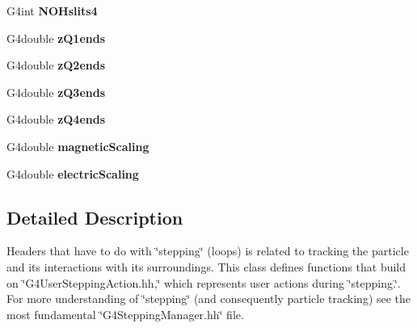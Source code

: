 \begin{DoxyCompactItemize}
\item 
\hypertarget{EMMASteppingAction_8hh_a2999d2feb52b63936e73e99587a94643}{G4int {\bfseries N\-O\-Hslits4}}\label{EMMASteppingAction_8hh_a2999d2feb52b63936e73e99587a94643}

\item 
\hypertarget{EMMASteppingAction_8hh_a8825e4bac9c627d0fc56ceb808baee99}{G4double {\bfseries z\-Q1ends}}\label{EMMASteppingAction_8hh_a8825e4bac9c627d0fc56ceb808baee99}

\item 
\hypertarget{EMMASteppingAction_8hh_a0389aed4a205ff7970a9c57db9776625}{G4double {\bfseries z\-Q2ends}}\label{EMMASteppingAction_8hh_a0389aed4a205ff7970a9c57db9776625}

\item 
\hypertarget{EMMASteppingAction_8hh_aa309293d04a3e9edd55505001bb8842f}{G4double {\bfseries z\-Q3ends}}\label{EMMASteppingAction_8hh_aa309293d04a3e9edd55505001bb8842f}

\item 
\hypertarget{EMMASteppingAction_8hh_aaefdf69418ceee3aabc72a346eef1799}{G4double {\bfseries z\-Q4ends}}\label{EMMASteppingAction_8hh_aaefdf69418ceee3aabc72a346eef1799}

\item 
\hypertarget{EMMASteppingAction_8hh_aeb29decdede3d925164d390a2bf4a67a}{G4double {\bfseries magnetic\-Scaling}}\label{EMMASteppingAction_8hh_aeb29decdede3d925164d390a2bf4a67a}

\item 
\hypertarget{EMMASteppingAction_8hh_a528ee0b2618db44ed7b0734789834f3d}{G4double {\bfseries electric\-Scaling}}\label{EMMASteppingAction_8hh_a528ee0b2618db44ed7b0734789834f3d}

\end{DoxyCompactItemize}


\subsection{Detailed Description}
Headers that have to do with \char`\"{}stepping\char`\"{} (loops) is related to tracking the particle and its interactions with its surroundings. This class defines functions that build on \char`\"{}\-G4\-User\-Stepping\-Action.\-hh,\char`\"{} which represents user actions during \char`\"{}stepping.\char`\"{}. For more understanding of \char`\"{}stepping\char`\"{} (and consequently particle tracking) see the most fundamental \char`\"{}\-G4\-Stepping\-Manager.\-hh\char`\"{} file. 